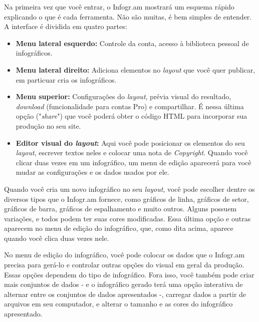 \documentclass[12pt,onecolumn]{article}
\begin{document}
    Na primeira vez que você entrar, o Infogr.am mostrará um esquema rápido
    explicando o que é cada ferramenta. Não são muitas, é bem simples de entender.
    A interface é dividida em quatro partes:
    
    \begin{itemize}
      \item
        \textbf{Menu lateral esquerdo:}
        Controle da conta, acesso à biblioteca pessoal de
        infográficos.
      \item
        \textbf{Menu lateral direito:}
        Adiciona elementos no \textit{layout} que você quer
        publicar, em particuar cria os infográficos.
      \item
        \textbf{Menu superior:}
        Configurações do \textit{layout}, prévia visual do resultado,
        \textit{download} (funcionalidade para contas Pro) e compartilhar. É nessa
        última opção ("\textit{share}") que você poderá obter o código HTML para
        incorporar sua produção no seu site.
      \item
        \textbf{Editor visual do \textit{layout}:}
        Aqui você pode posicionar os elementos do seu \textit{layout}, escrever
        textos neles e colocar uma nota de \textit{Copyright}. Quando você clicar
        duas vezes em um infográfico, um menu de edição aparecerá para você mudar
        as configurações e os dados usados por ele.
    \end{itemize}
    
    Quando você cria um novo infográfico no seu \textit{layout}, você pode
    escolher dentre os diversos tipos que o Infogr.am fornece, como gráficos de
    linha, gráficos de setor, gráficos de barra, gráficos de espalhamento e
    muito outros. Alguns possuem variações, e todos podem ter suas cores
    modificadas. Essa última opção e outras aparecem no menu de edição do
    infográfico, que, como dita acima, aparece quando você clica duas vezes
    nele.
    
    No menu de edição do infográfico, você pode colocar os dados que o Infogr.am
    precisa para gerá-lo e controlar outras opções do visual em geral da
    produção. Essas opções dependem do tipo de infográfico. Fora isso, você
    também pode criar mais conjuntos de dados - e o infográfico gerado terá uma
    opção interativa de alternar entre os conjuntos de dados apresentados -,
    carregar dados a partir de arquivos em seu computador, e alterar o tamanho e
    as cores do infográfico apresentado.
    
\end{document}
